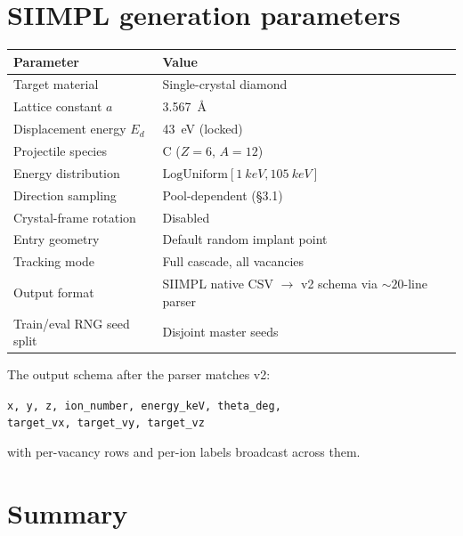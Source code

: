 \documentclass[11pt]{article}
\begin{document}
\section{SIIMPL generation parameters}

\begin{center}
  \begin{tabular}{ll}
    \toprule
    Parameter & Value \\
    \midrule
    Target material               & Single-crystal diamond \\
    Lattice constant $a$          & \SI{3.567}{\angstrom} \\
    Displacement energy $E_d$     & \SI{43}{eV} (locked) \\
    Projectile species            & C ($Z=6$, $A=12$) \\
    Energy distribution           & $\mathrm{LogUniform}[\SI{1}{keV}, \SI{105}{keV}]$ \\
    Direction sampling            & Pool-dependent (\S 3.1) \\
    Crystal-frame rotation        & Disabled \\
    Entry geometry                & Default random implant point \\
    Tracking mode                 & Full cascade, all vacancies \\
    Output format                 & SIIMPL native CSV $\to$ v2 schema via $\sim 20$-line parser \\
    Train/eval RNG seed split     & Disjoint master seeds \\
    \bottomrule
  \end{tabular}
\end{center}

The output schema after the parser matches v2:
\begin{center}
  \texttt{x, y, z, ion\_number, energy\_keV, theta\_deg,}\\
  \texttt{target\_vx, target\_vy, target\_vz}
\end{center}
with per-vacancy rows and per-ion labels broadcast across them.

\section{Summary}
\end{document}
